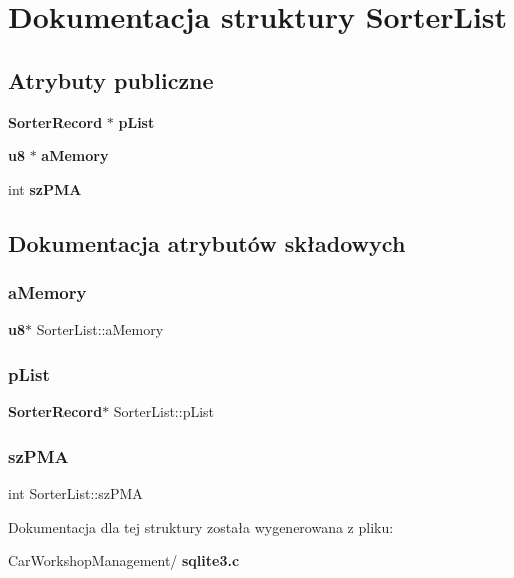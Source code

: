 \section{Dokumentacja struktury Sorter\+List}
\label{struct_sorter_list}
\subsection*{Atrybuty publiczne}
\begin{DoxyCompactItemize}
\item 
\textbf{ Sorter\+Record} $\ast$ \textbf{ p\+List}
\item 
\textbf{ u8} $\ast$ \textbf{ a\+Memory}
\item 
int \textbf{ sz\+P\+MA}
\end{DoxyCompactItemize}


\subsection{Dokumentacja atrybutów składowych}
\mbox{\label{struct_sorter_list_ae0c7c3714fd8c61b806a5767ce686344}} 
\subsubsection{aMemory}
{\footnotesize\ttfamily \textbf{ u8}$\ast$ Sorter\+List\+::a\+Memory}

\mbox{\label{struct_sorter_list_a913640b1b917acccd7a851483f9d4e2b}} 
\subsubsection{pList}
{\footnotesize\ttfamily \textbf{ Sorter\+Record}$\ast$ Sorter\+List\+::p\+List}

\mbox{\label{struct_sorter_list_a4d14b7e48b155f6b79dd6fd37645b73c}} 
\subsubsection{szPMA}
{\footnotesize\ttfamily int Sorter\+List\+::sz\+P\+MA}



Dokumentacja dla tej struktury została wygenerowana z pliku\+:\begin{DoxyCompactItemize}
\item 
Car\+Workshop\+Management/\textbf{ sqlite3.\+c}\end{DoxyCompactItemize}
